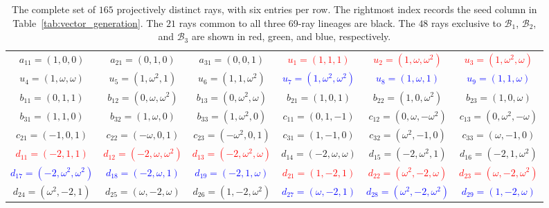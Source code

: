 \documentclass[%
  reprint,
  superscriptaddress,
  showpacs,
  showkeys,
  amsmath,amssymb,
  pra,
  longbibliography,
  floatfix,
  x11names
]{revtex4-2}
\newcommand{\rev}[1]{{#1}}
\begin{document}
\begin{table}[htbp!]
\caption{
\rev{The complete set of $165$ projectively distinct rays, with six entries per row.  The rightmost index records the seed column in Table~\ref{tab:vector_generation}.  The $21$ rays common to all three 69-ray lineages are black.  The $48$ rays exclusive to $\mathcal{B}_1$, $\mathcal{B}_2$, and $\mathcal{B}_3$ are shown in red, green, and blue, respectively.}
}
\label{tab:noncollinear_vectors_6col}
\footnotesize %
\begin{ruledtabular}
\begin{tabular}{*{6}{c}} %
{$a_{11}=(1,0,0)$} & {$a_{21}=(0,1,0)$} & {$a_{31}=(0,0,1)$} & \textcolor{red}{$u_{1}=(1,1,1)$} & \textcolor{red}{$u_{2}=(1,\omega,\omega^2)$} & \textcolor{red}{$u_{3}=(1,\omega^2,\omega)$} \\
\textcolor{green!40!black}{$u_{4}=(1,\omega,\omega)$} & \textcolor{green!40!black}{$u_{5}=(1,\omega^2,1)$} & \textcolor{green!40!black}{$u_{6}=(1,1,\omega^2)$} & \textcolor{blue}{$u_{7}=(1,\omega^2,\omega^2)$} & \textcolor{blue}{$u_{8}=(1,\omega,1)$} & \textcolor{blue}{$u_{9}=(1,1,\omega)$} \\
{$b_{11}=(0,1,1)$} & {$b_{12}=(0,\omega,\omega^2)$} & {$b_{13}=(0,\omega^2,\omega)$} & {$b_{21}=(1,0,1)$} & {$b_{22}=(1,0,\omega^2)$} & {$b_{23}=(1,0,\omega)$} \\
{$b_{31}=(1,1,0)$} & {$b_{32}=(1,\omega,0)$} & {$b_{33}=(1,\omega^2,0)$} & {$c_{11}=(0,1,-1)$} & {$c_{12}=(0,\omega,-\omega^2)$} & {$c_{13}=(0,\omega^2,-\omega)$} \\
{$c_{21}=(-1,0,1)$} & {$c_{22}=(-\omega,0,1)$} & {$c_{23}=(-\omega^2,0,1)$} & {$c_{31}=(1,-1,0)$} & {$c_{32}=(\omega^2,-1,0)$} & {$c_{33}=(\omega,-1,0)$} \\
\textcolor{red}{$d_{11}=(-2,1,1)$} & \textcolor{red}{$d_{12}=(-2,\omega,\omega^2)$} & \textcolor{red}{$d_{13}=(-2,\omega^2,\omega)$} & \textcolor{green!40!black}{$d_{14}=(-2,\omega,\omega)$} & \textcolor{green!40!black}{$d_{15}=(-2,\omega^2,1)$} & \textcolor{green!40!black}{$d_{16}=(-2,1,\omega^2)$} \\
\textcolor{blue}{$d_{17}=(-2,\omega^2,\omega^2)$} & \textcolor{blue}{$d_{18}=(-2,\omega,1)$} & \textcolor{blue}{$d_{19}=(-2,1,\omega)$} & \textcolor{red}{$d_{21}=(1,-2,1)$} & \textcolor{red}{$d_{22}=(\omega^2,-2,\omega)$} & \textcolor{red}{$d_{23}=(\omega,-2,\omega^2)$} \\
\textcolor{green!40!black}{$d_{24}=(\omega^2,-2,1)$} & \textcolor{green!40!black}{$d_{25}=(\omega,-2,\omega)$} & \textcolor{green!40!black}{$d_{26}=(1,-2,\omega^2)$} & \textcolor{blue}{$d_{27}=(\omega,-2,1)$} & \textcolor{blue}{$d_{28}=(\omega^2,-2,\omega^2)$} & \textcolor{blue}{$d_{29}=(1,-2,\omega)$} \\

\end{tabular}
\end{ruledtabular}
\end{table}
\end{document}
